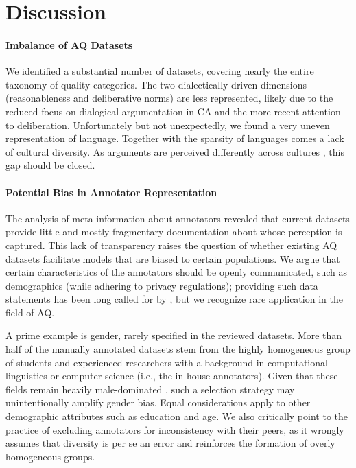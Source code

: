 \section{Discussion}
\label{sec:discussion}

\paragraph{Imbalance of AQ Datasets}
We identified a substantial number of datasets, covering nearly the entire taxonomy of quality categories.
The two dialectically-driven dimensions (reasonableness and deliberative norms) are less represented, likely due to the reduced focus on dialogical argumentation in CA and the more recent attention to deliberation. Unfortunately but not unexpectedly, we found a very uneven representation of language. Together with the sparsity of languages comes a lack of cultural diversity. As arguments are perceived differently across cultures \cite{han1994culture, Shen2023culture}, this gap should be closed.

\paragraph{Potential Bias in Annotator Representation}
The analysis of meta-information about annotators revealed that current datasets provide little and mostly fragmentary documentation about whose perception is captured. This lack of transparency raises the question of whether existing AQ datasets facilitate models that are biased to certain populations. We argue that certain characteristics of the annotators should be openly communicated, such as demographics (while adhering to privacy regulations); providing such data statements has been long called for by \citet{bender-friedman-2018-data}, but we recognize rare application in the field of AQ.

A prime example is gender, rarely specified in the reviewed datasets. More than half of the manually annotated datasets stem from the highly homogeneous group of students and experienced researchers with a background in computational linguistics or computer science (i.e., the in-house annotators). Given that these fields remain heavily male-dominated \cite{schluter-2018-glass}, such a selection strategy may unintentionally amplify gender bias. Equal considerations apply to other demographic attributes such as education and age. We also critically point to the practice of excluding annotators for inconsistency with their peers, as it wrongly assumes that diversity is per se an error and reinforces the formation of overly homogeneous groups.

